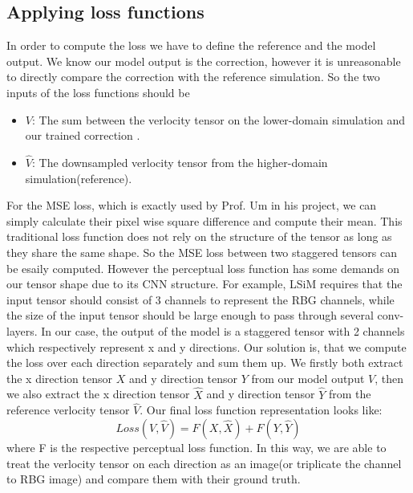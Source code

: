 \documentclass[a4paper,12pt,twoside]{report}
\begin{document}
\subsection{Applying loss functions}
In order to compute the loss we have to define the reference and the model output. We know our model output is the correction, however it is unreasonable to directly compare the correction with the reference simulation. So the two inputs of the loss functions should be 
\begin{itemize}
\item $V$: The sum between the verlocity tensor on the lower-domain simulation and our trained correction .

\item $\hat{V}$: The downsampled verlocity tensor from the higher-domain simulation(reference).
\end{itemize}


For the MSE loss, which is exactly used by Prof. Um in his project, we can simply calculate their pixel wise square difference and compute their mean. This traditional loss function does not rely on the structure of the tensor as long as they share the same shape. So the MSE loss between two staggered tensors can be esaily computed. However the perceptual loss function has some demands on our tensor shape due to its CNN structure. For example, LSiM requires that the input tensor should consist of 3 channels to represent the RBG channels, while the size of the input tensor should be large enough to pass through several conv-layers. In our case, the output of the model is a staggered tensor with 2 channels which respectively represent x and y directions. Our solution is, that we compute the loss over each direction separately and sum them up. We firstly both extract the x direction tensor $X$ and y direction tensor $Y$ from our model output $V$, then we also extract the x direction tensor $\hat{X}$ and y direction tensor $\hat{Y}$ from the reference verlocity tensor $\hat{V}$. Our final loss function representation looks like:
\begin{equation}
 Loss(V, \hat{V}) = F(X, \hat{X}) + F(Y, \hat{Y})
\end{equation}
where F is the respective perceptual loss function. In this way, we are able to treat the verlocity tensor on each direction as an image(or triplicate the channel to RBG image) and compare them with their ground truth.  






\end{document}
